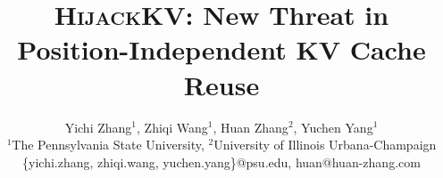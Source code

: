 \documentclass[letterpaper,twocolumn,10pt]{article}
\begin{document}
\date{}
\title{\textsc{HijackKV}: New Threat in Position-Independent KV Cache Reuse}

\author{
\rm{Yichi Zhang$^1$,
Zhiqi Wang$^1$,
Huan Zhang$^2$,
Yuchen Yang$^1$}\\
$^1$The Pennsylvania State University,
$^2$University of Illinois Urbana-Champaign \\
\{yichi.zhang, zhiqi.wang, yuchen.yang\}@psu.edu, huan@huan-zhang.com
}

\maketitle













\appendix







\end{document}
